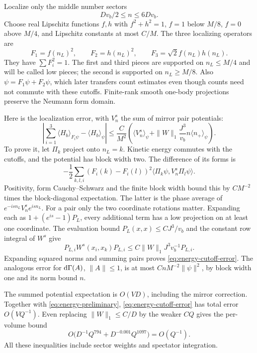Localize only the middle number sectors
\[
                       Dv_b/2\le n\le6Dv_b.
\]
Choose real Lipschitz functions $f,h$ with $f^2+h^2=1$, $f=1$ below
$M/8$, $f=0$ above $M/4$, and Lipschitz constants at most $C/M$.
The three localizing operators are
\begin{equation}\label{eq:energy-cutoffs}
 F_1=f(n_L)^2,\qquad F_2=h(n_L)^2,\qquad F_3=\sqrt2f(n_L)h(n_L).
\end{equation}
They have $\sum F_i^2=1$.  The first and third pieces are supported on
$n_L\le M/4$ and will be called low pieces; the second is supported on
$n_L\ge M/8$.  Also $\psi=F_1\psi+F_2\psi$, which later transfers
count estimates even though counts need not commute with these cutoffs.
Finite-rank smooth one-body projections preserve the Neumann form domain.

Here is the localization error, with $V_n^s$ the sum of mirror pair
potentials:
\begin{equation}\label{eq:energy-cutoff-error}
 \left|\sum_{i=1}^3\langle H_b\rangle_{F_i\psi}
                      -\langle H_b\rangle_\psi\right|
 \le\frac C{M^2}\left(\langle V_n^s\rangle_\psi
       +\|W\|_1\frac{J^3}{v_b}n\langle n_+\rangle_\psi\right).
\end{equation}
To prove it, let $\Pi_k$ project onto $n_L=k$.  Kinetic energy commutes
with the cutoffs, and the potential has block width two.  The difference
of its forms is
\[
 -\frac12\sum_{k,l,i}(F_i(k)-F_i(l))^2
                       \langle\Pi_k\psi,V_n^s\Pi_l\psi\rangle.
\]
Positivity, form Cauchy--Schwarz and the finite block width bound this
by $CM^{-2}$ times the block-diagonal expectation.  The latter is the
phase average of $e^{-isn_L}V_n^se^{isn_L}$.  For a pair only the two
coordinate rotations matter.  Expanding each as
$1+(e^{is}-1)P_L$, every additional term has a low projection on at
least one coordinate.  The evaluation bound
$P_L(x,x)\le CJ^3/v_b$ and the constant row integral of $W^s$ give
\[
 P_{L,i}W^s(x_i,x_k)P_{L,i}
       \le C\|W\|_1J^3v_b^{-1}P_{L,i}.
\]
Expanding squared norms and summing pairs proves
\eqref{eq:energy-cutoff-error}.
The analogous error for $\mathrm d\Gamma(A)$, $\|A\|\le1$, is at most
$CnM^{-2}\|\psi\|^2$, by block width one and its norm bound $n$.

The summed potential expectation is $O(VD)$, including the mirror
correction.  Together with \eqref{eq:energy-preliminary},
\eqref{eq:energy-cutoff-error} has total error $O(VQ^{-1})$.
Even replacing $\|W\|_1\le C/D$ by the weaker $CQ$ gives the per-volume
bound
\[
 O\bigl(D^{-1}Q^{794}+D^{-0.001}Q^{1097}\bigr)=O(Q^{-1}).
\]
All these inequalities include sector weights and spectator integration.


